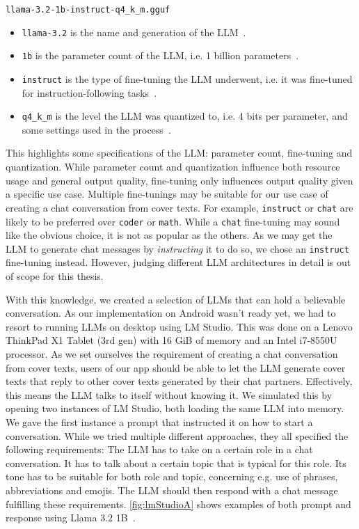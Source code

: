 \begin{center}
	\lstinline|llama-3.2-1b-instruct-q4_k_m.gguf|
\end{center}

\begin{itemize}
	\item \lstinline|llama-3.2| is the name and generation of the \gls{LLM}~\cite{metaMetallamaLlamamodels2025}.
	\item \lstinline|1b| is the parameter count of the \gls{LLM}, i.e. 1 billion parameters~\cite{huggingfaceGGUF}.
	\item \lstinline|instruct| is the type of fine-tuning the \gls{LLM} underwent, i.e. it was fine-tuned for instruction-following tasks~\cite{huggingfaceGGUF}.
	\item \lstinline|q4_k_m| is the level the \gls{LLM} was quantized to, i.e. 4 bits per parameter, and some settings used in the process~\cite{huggingfaceGGUF}.
\end{itemize}

This highlights some specifications of the \gls{LLM}: parameter count, fine-tuning and quantization. While parameter count and quantization influence both resource usage and general output quality, fine-tuning only influences output quality given a specific use case. Multiple fine-tunings may be suitable for our use case of creating a chat conversation from cover texts. For example, \lstinline|instruct| or \lstinline|chat| are likely to be preferred over \lstinline|coder| or \lstinline|math|. While a \lstinline|chat| fine-tuning may sound like the obvious choice, it is not as popular as the others. As we may get the \gls{LLM} to generate chat messages by \textit{instructing} it to do so, we chose an \lstinline|instruct| fine-tuning instead. However, judging different \gls{LLM} architectures in detail is out of scope for this thesis.

With this knowledge, we created a selection of \glspl{LLM} that can hold a believable conversation. As our implementation on Android wasn't ready yet, we had to resort to running \glspl{LLM} on desktop using LM Studio. This was done on a Lenovo ThinkPad X1 Tablet (3rd gen) with 16 GiB of memory and an Intel i7-8550U processor. As we set ourselves the requirement of creating a chat conversation from cover texts, users of our app should be able to let the \gls{LLM} generate cover texts that reply to other cover texts generated by their chat partners. Effectively, this means the \gls{LLM} talks to itself without knowing it. We simulated this by opening two instances of LM Studio, both loading the same \gls{LLM} into memory. We gave the first instance a prompt that instructed it on how to start a conversation. While we tried multiple different approaches, they all specified the following requirements: The \gls{LLM} has to take on a certain role in a chat conversation. It has to talk about a certain topic that is typical for this role. Its tone has to be suitable for both role and topic, concerning e.g. use of phrases, abbreviations and emojis. The \gls{LLM} should then respond with a chat message fulfilling these requirements. \cref{fig:lmStudioA} shows examples of both prompt and response using Llama 3.2 1B~\cite{huggingquantsHuggingquantsLlama321BInstructQ4_K_MGGUFHugging2024}.

